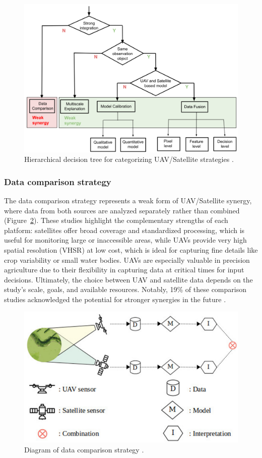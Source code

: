 \begin{figure}[H]
    \centering
    \includegraphics[width=0.8
    \textwidth]{chapters/chapter3/images/Figure11.png}
    \caption{Hierarchical decision tree for categorizing UAV/Satellite strategies \parencite{AlvarezVanhard2021}.}
    \label{fig:UAVSatelliteStrategies}
\end{figure}


\subsubsection{Data comparison strategy}
The data comparison strategy represents a weak form of UAV/Satellite synergy, where data from both sources are analyzed separately rather than combined (Figure~\ref{fig:DataComparison}). These studies highlight the complementary strengths of each platform: satellites offer broad coverage and standardized processing, which is useful for monitoring large or inaccessible areas, while UAVs provide very high spatial resolution (VHSR) at low cost, which is ideal for capturing fine details like crop variability or small water bodies. UAVs are especially valuable in precision agriculture due to their flexibility in capturing data at critical times for input decisions. Ultimately, the choice between UAV and satellite data depends on the study's scale, goals, and available resources. Notably, 19\% of these comparison studies acknowledged the potential for stronger synergies in the future \parencite{AlvarezVanhard2021}.

\begin{figure}[H]
    \centering
    \includegraphics[width=0.6
    \textwidth]{chapters/chapter3/images/Figure12.png}
    \caption{Diagram of data comparison strategy \parencite{AlvarezVanhard2021}.}
    \label{fig:DataComparison}
\end{figure}


